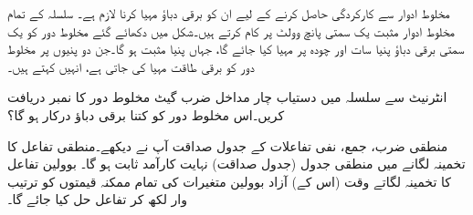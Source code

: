 مخلوط ادوار سے کارکردگی حاصل کرنے کے لیے ان کو برقی دباؤ مہیا کرنا لازم ہے۔ سلسلہ  کے تمام مخلوط ادوار مثبت یک سمتی پانچ وولٹ  پر کام کرتے ہیں۔شکل  میں دکھائے گئے مخلوط دور کو یک سمتی برقی دباؤ پنیا سات  اور چودہ  پر مہیا کیا جائے گا، جہاں پنیا  مثبت ہو گا۔جن دو پنیوں پر مخلوط دور کو برقی طاقت مہیا کی جاتی ہے، انہیں  کہتے ہیں۔

انٹرنیٹ سے سلسلہ  میں دستیاب چار مداخل ضرب گیٹ مخلوط دور کا نمبر دریافت کریں۔اس مخلوط دور کو کتنا برقی دباؤ درکار ہو گا؟

منطقی ضرب، جمع، نفی تفاعلات کے جدول صداقت  آپ نے دیکھے۔منطقی تفاعل کا تخمینہ لگانے میں منطقی جدول  (جدول صداقت)  نہایت کارآمد ثابت ہو گا۔
بوولین تفاعل کا تخمینہ لگاتے وقت (اس کے) آزاد بوولین متغیرات کی تمام ممکنہ قیمتوں کو ترتیب وار لکھ کر تفاعل حل کیا جائے گا۔


